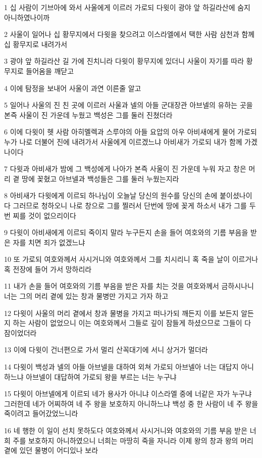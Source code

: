 \par 1 십 사람이 기브아에 와서 사울에게 이르러 가로되 다윗이 광야 앞 하길라산에 숨지 아니하였나이까
\par 2 사울이 일어나 십 황무지에서 다윗을 찾으려고 이스라엘에서 택한 사람 삼천과 함께 십 황무지로 내려가서
\par 3 광야 앞 하길라산 길 가에 진치니라 다윗이 황무지에 있더니 사울이 자기를 따라 황무지로 들어옴을 깨닫고
\par 4 이에 탐정을 보내어 사울이 과연 이른줄 알고
\par 5 일어나 사울의 진 친 곳에 이르러 사울과 넬의 아들 군대장관 아브넬의 유하는 곳을 본즉 사울이 진 가운데 누웠고 백성은 그를 둘러 진쳤더라
\par 6 이에 다윗이 헷 사람 아히멜렉과 스루야의 아들 요압의 아우 아비새에게 물어 가로되 누가 나로 더불어 진에 내려가서 사울에게 이르겠느냐 아비새가 가로되 내가 함께 가겠나이다
\par 7 다윗과 아비새가 밤에 그 백성에게 나아가 본즉 사울이 진 가운데 누워 자고 창은 머리 곁 땅에 꽂혔고 아브넬과 백성들은 그를 둘러 누웠는지라
\par 8 아비새가 다윗에게 이르되 하나님이 오늘날 당신의 원수를 당신의 손에 붙이셨나이다 그러므로 청하오니 나로 창으로 그를 찔러서 단번에 땅에 꽂게 하소서 내가 그를 두번 찌를 것이 없으리이다
\par 9 다윗이 아비새에게 이르되 죽이지 말라 누구든지 손을 들어 여호와의 기름 부음을 받은 자를 치면 죄가 없겠느냐
\par 10 또 가로되 여호와께서 사시거니와 여호와께서 그를 치시리니 혹 죽을 날이 이르거나 혹 전장에 들어 가서 망하리라
\par 11 내가 손을 들어 여호와의 기름 부음을 받은 자를 치는 것을 여호와께서 금하시나니 너는 그의 머리 곁에 있는 창과 물병만 가지고 가자 하고
\par 12 다윗이 사울의 머리 곁에서 창과 물병을 가지고 떠나가되 깨든지 이를 보든지 알든지 하는 사람이 없었으니 이는 여호와께서 그들로 깊이 잠들게 하셨으므로 그들이 다 잠이었더라
\par 13 이에 다윗이 건너편으로 가서 멀리 산꼭대기에 서니 상거가 멀더라
\par 14 다윗이 백성과 넬의 아들 아브넬을 대하여 외쳐 가로되 아브넬아 너는 대답지 아니하느냐 아브넬이 대답하여 가로되 왕을 부르는 너는 누구냐
\par 15 다윗이 아브넬에게 이르되 네가 용사가 아니냐 이스라엘 중에 너같은 자가 누구냐 그러한데 네가 어찌하여 네 주 왕을 보호하지 아니하느냐 백성 중 한 사람이 네 주 왕을 죽이려고 들어갔었느니라
\par 16 네 행한 이 일이 선치 못하도다 여호와께서 사시거니와 여호와의 기름 부음 받은 너희 주를 보호하지 아니하였으니 너희는 마땅히 죽을 자니라 이제 왕의 창과 왕의 머리곁에 있던 물병이 어디있나 보라
